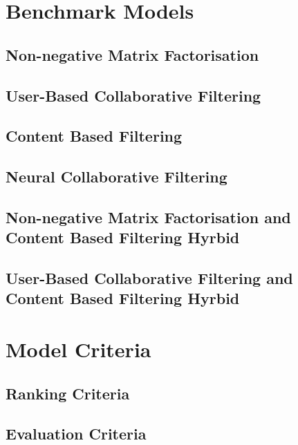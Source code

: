 
\section{Benchmark Models}
\subsection{Non-negative Matrix Factorisation}
\subsection{User-Based Collaborative Filtering}
\subsection{Content Based Filtering}
\subsection{Neural Collaborative Filtering}
\subsection{Non-negative Matrix Factorisation and Content Based Filtering Hyrbid}
\subsection{User-Based Collaborative Filtering and Content Based Filtering Hyrbid}


\section{Model Criteria}
\subsection{Ranking Criteria}
\subsection{Evaluation Criteria}